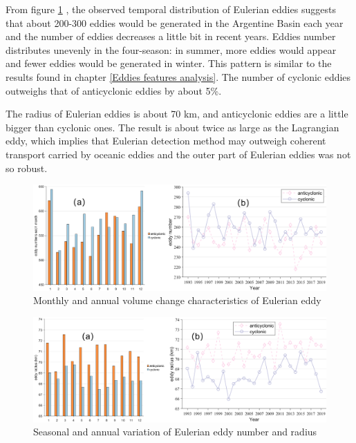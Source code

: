 From figure \ref{Eulerian eddy number} , the observed temporal distribution of Eulerian eddies suggests that about 200-300 eddies would be generated in the Argentine Basin each year and the number of eddies decreases a little bit in recent years.
Eddies number distributes unevenly in the four-season: in summer, more eddies would appear and fewer eddies would be generated in winter. This pattern is similar to the results found in chapter \ref{Eddies features analysis}. The number of cyclonic eddies outweighs that of anticyclonic eddies by about 5\%.

The radius of Eulerian eddies is about 70 km, and anticyclonic eddies are a little bigger than cyclonic ones. The result is about twice as large as the Lagrangian eddy, which implies that Eulerian detection method may outweigh coherent transport carried by oceanic eddies and the outer part of Eulerian eddies was not so robust.

\begin{figure}[ht]
  \centering
  \setlength{\abovecaptionskip}{0.cm}
  \includegraphics[width=15cm]{chapter/figure/Eulerian eddy number.png}
  \caption
  {Monthly and annual volume change characteristics of Eulerian eddy}
  \label{Eulerian eddy number}
\end{figure}


\begin{figure}[ht]
  \centering
  \setlength{\abovecaptionskip}{0.cm}
  \includegraphics[width=15cm]{chapter/figure/Eulerian eddy radius.png}
  \caption
  {Seasonal and annual variation of Eulerian eddy number and radius}
  \label{Eulerian eddy radius}
\end{figure}



